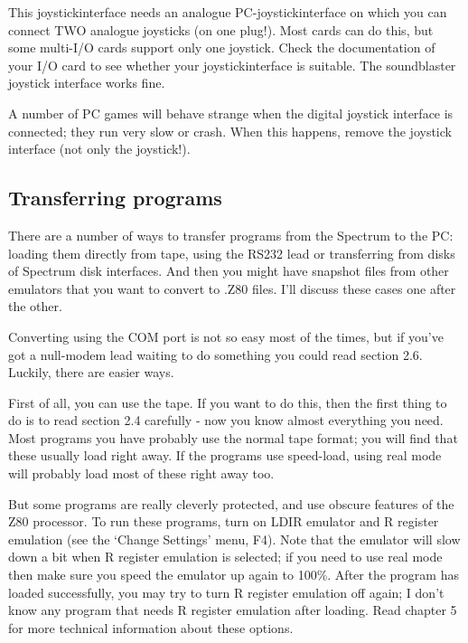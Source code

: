     This joystickinterface needs an analogue PC-joystickinterface on which
    you can connect TWO analogue joysticks (on one plug!).  Most cards can
    do this, but some multi-I/O cards support only one joystick.  Check the
    documentation of your I/O card to see whether your joystickinterface is
    suitable.  The soundblaster joystick interface works fine.

    A number of PC games will behave strange when the digital joystick
    interface is connected; they run very slow or crash.  When this happens,
    remove the joystick interface (not only the joystick!).



\subsection{Transferring programs}

    There are a number of ways to transfer programs from the Spectrum to the
    PC: loading them directly from tape, using the RS232 lead or
    transferring from disks of Spectrum disk interfaces.  And then you might
    have snapshot files from other emulators that you want to convert to
    .Z80 files.  I'll discuss these cases one after the other.

    Converting using the COM port is not so easy most of the times, but if
    you've got a null-modem lead waiting to do something you could read
    section 2.6.  Luckily, there are easier ways.

    First of all, you can use the tape.  If you want to do this, then the
    first thing to do is to read section 2.4 carefully - now you know almost
    everything you need.  Most programs you have probably use the normal
    tape format; you will find that these usually load right away. If the
    programs use speed-load, using real mode will probably load most of
    these right away too.

    But some programs are really cleverly protected, and use obscure
    features of the Z80 processor.  To run these programs, turn on LDIR
    emulator and R register emulation (see the `Change Settings' menu, F4).
    Note that the emulator will slow down a bit when R register emulation is
    selected; if you need to use real mode then make sure you speed the
    emulator up again to 100\%.  After the program has loaded successfully,
    you may try to turn R register emulation off again; I don't know any
    program that needs R register emulation after loading.  Read chapter 5
    for more technical information about these options.

